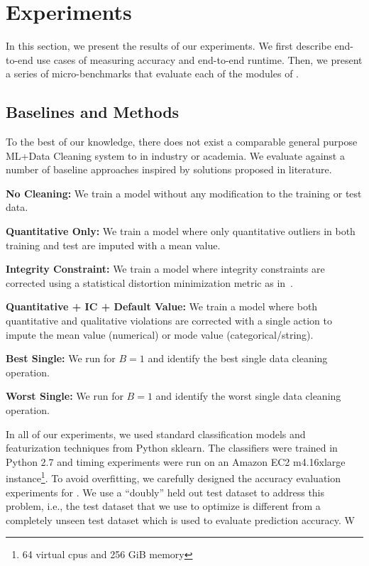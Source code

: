 \section{Experiments}
In this section, we present the results of our experiments.
We first describe end-to-end use cases of \sys measuring accuracy and end-to-end runtime.
Then, we present a series of micro-benchmarks that evaluate each of the modules of \sys.

\subsection{Baselines and Methods}
To the best of our knowledge, there does not exist a comparable general purpose ML+Data Cleaning system to \sys in industry or academia.
We evaluate \sys against a number of baseline approaches inspired by solutions proposed in literature. 

\vspace{0.25em}\noindent\textbf{No Cleaning: } We train a model without any modification to the training or test data.

\vspace{0.25em}\noindent\textbf{Quantitative Only: } We train a model where only quantitative outliers in both training and test are imputed with a mean value. 

\vspace{0.25em}\noindent\textbf{Integrity Constraint: } We train a model where integrity constraints are corrected using a statistical distortion minimization metric as in~\cite{prokoshyna2015combining}.

\vspace{0.25em}\noindent\textbf{Quantitative + IC + Default Value: } We train a model where both quantitative and qualitative violations are corrected with a single action to impute the mean value (numerical) or mode value (categorical/string).

\vspace{0.25em}\noindent\textbf{Best Single: } We run \sys for $B=1$ and identify the best single data cleaning operation.

\vspace{0.25em}\noindent\textbf{Worst Single: } We run \sys for $B=1$ and identify the worst single data cleaning operation.

\vspace{0.25em}
In all of our experiments, we used standard classification models and featurization techniques from Python \textsf{sklearn}.
The classifiers were trained in Python 2.7 and timing experiments were run on an Amazon EC2 m4.16xlarge instance\footnote{64 virtual cpus and 256 GiB memory}.
To avoid overfitting, we carefully designed the accuracy evaluation experiments for \sys.
We use a ``doubly'' held out test dataset to address this problem, i.e., the test dataset that we use to optimize \sys is different from a completely unseen test dataset which is used to evaluate prediction accuracy.
W 

